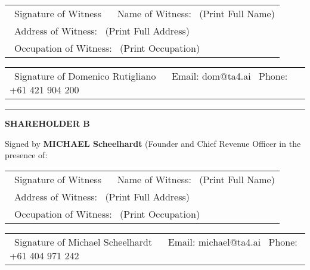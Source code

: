 \begin{tabular}{@{}p{}@{}}
\hrulefill \
Signature of Witness \
\vspace{1ex} \
Name of Witness: \
(Print Full Name) \\
\hrulefill \
Address of Witness: \
(Print Full Address) \\
\hrulefill \
Occupation of Witness: \
(Print Occupation)
\end{tabular}
\hspace{0.05\textwidth} %
\begin{tabular}{@{}p{}@{}}
\hrulefill \
Signature of Domenico Rutigliano \
\vspace{1ex} \
Email: dom@ta4.ai \
Phone: +61 421 904 200
\end{tabular}

\vspace{6ex}

\noindent\rule{\textwidth}{0.4pt} %
\vspace{2ex}

\textbf{SHAREHOLDER B}

\vspace{2ex}

\noindent Signed by \textbf{MICHAEL Scheelhardt} (Founder and Chief Revenue Officer in the presence of:

\vspace{4ex}

\begin{tabular}{@{}p{}@{}}
\hrulefill \
Signature of Witness \
\vspace{1ex} \
Name of Witness: \
(Print Full Name) \\
\hrulefill \
Address of Witness: \
(Print Full Address) \\
\hrulefill \
Occupation of Witness: \
(Print Occupation)
\end{tabular}
\hspace{0.05\textwidth} %
\begin{tabular}{@{}p{}@{}}
\hrulefill \
Signature of Michael Scheelhardt \
\vspace{1ex} \
Email: michael@ta4.ai \
Phone: +61 404 971 242
\end{tabular}

\vspace{6ex}

